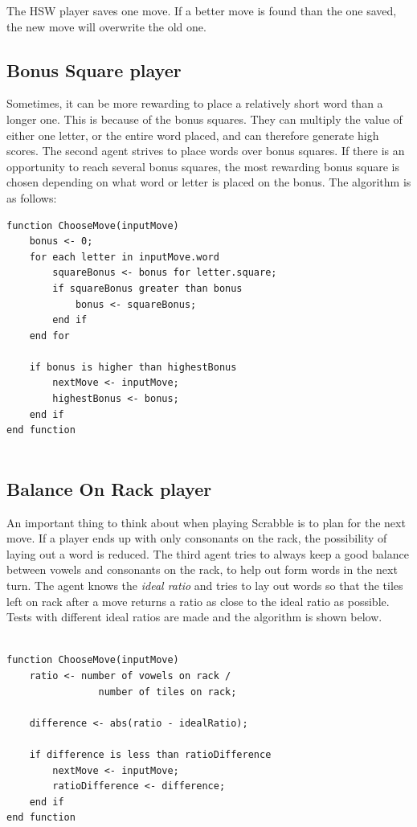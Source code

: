 \documentclass[a4paper, 12pt]{report}
\begin{document}
The HSW player saves one move. If a better move is found than the one saved, the new move will overwrite the old one.

\subsection{Bonus Square player}
Sometimes, it can be more rewarding to place a relatively short word than a longer one. This is because of the bonus squares. They can multiply the value of either one letter, or the entire word placed, and can therefore generate high scores. The second agent strives to place words over bonus squares. If there is an opportunity to reach several bonus squares, the most rewarding bonus square is chosen depending on what word or letter is placed on the bonus. The algorithm is as follows:

\begin{lstlisting}
function ChooseMove(inputMove)
	bonus <- 0;
	for each letter in inputMove.word
		squareBonus <- bonus for letter.square;
		if squareBonus greater than bonus
			bonus <- squareBonus;
		end if 
	end for
	
	if bonus is higher than highestBonus
		nextMove <- inputMove;
		highestBonus <- bonus;
	end if
end function
			
\end{lstlisting}

\subsection{Balance On Rack player}
An important thing to think about when playing Scrabble is to plan for the next move. If a player ends up with only consonants on the rack, the possibility of laying out a word is reduced. The third agent tries to always keep a good balance between vowels and consonants on the rack, to help out form words in the next turn. The agent knows the \emph{ideal ratio} and tries to lay out words so that the tiles left on rack after a move returns a ratio as close to the ideal ratio as possible. Tests with different ideal ratios are made and the algorithm is shown below.

\begin{lstlisting}

function ChooseMove(inputMove)
	ratio <- number of vowels on rack / 
				number of tiles on rack;

	difference <- abs(ratio - idealRatio);

	if difference is less than ratioDifference
		nextMove <- inputMove;
		ratioDifference <- difference;
	end if
end function
\end{lstlisting}
\end{document}
